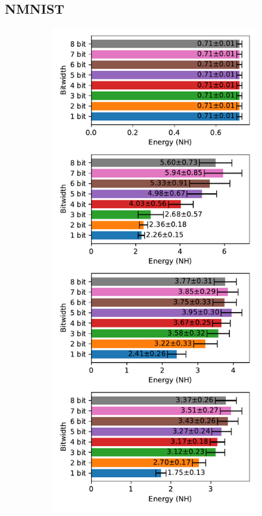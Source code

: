     \subsection{NMNIST}
    \label{appendix:energy_neuromorphic_nmnist}

        \begin{figure}[H]
            \centering
            \begin{subfigure}[H]{0.495\textwidth}
                \includegraphics[width=\textwidth]{../standard/NMNIST/plots/nmnist_test_energy_nh.pdf}

\end{subfigure}
\end{figure}
